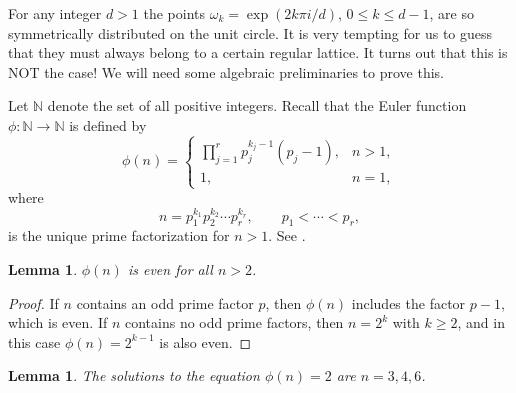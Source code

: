 \documentclass[reqno,11pt]{amsart}
\newtheorem{lemma}[theorem]{Lemma}
\newcommand{\N}{\mathbb N}
\newcommand{\R}{\mathbb R}
\begin{document}
\bigskip
{}
\bigskip

For any integer $d>1$ the points $\omega_k=\exp(2k\pi i/d)$,
$0\le k\le d-1$, are so symmetrically distributed on the unit circle.
It is very tempting for us to guess that they must always belong to 
a certain regular lattice. It turns out that this is NOT the case! 
We will need some algebraic preliminaries to prove this.

Let $\N$ denote the set of all positive integers. Recall that the 
Euler function $\phi: \N\to\N$ is defined by
$$\phi(n) = \begin{cases}
\prod_{j=1}^{r}p_{j}^{k_{j}-1}(p_{j}-1), & n>1,\\
1, & n=1,\end{cases}$$
where 
$$n=p_{1}^{k_{1}} p_{2}^{k_{2}} \cdots p_{r}^{k_{r}}, 
\qquad p_1<\cdots<p_r,$$
is the unique prime factorization for $n>1$. See \cite[pp. 95-96]{L2002}.

\begin{lemma}\label{l2}
$\phi(n)$ is even for all $n>2$. 
\end{lemma}

\begin{proof}
If $n$ contains an odd prime factor $p$, then $\phi(n)$ includes 
the factor $p-1$, which is even. If $n$ contains no odd prime factors, 
then $n=2^{k}$ with $k\geq 2$, and in this case $\phi(n)=2^{k-1}$ 
is also even.
\end{proof}

\begin{lemma}\label{l3}
The solutions to the equation $\phi(n)=2$ are $n=3, 4, 6$.
\end{lemma}
\end{document}
